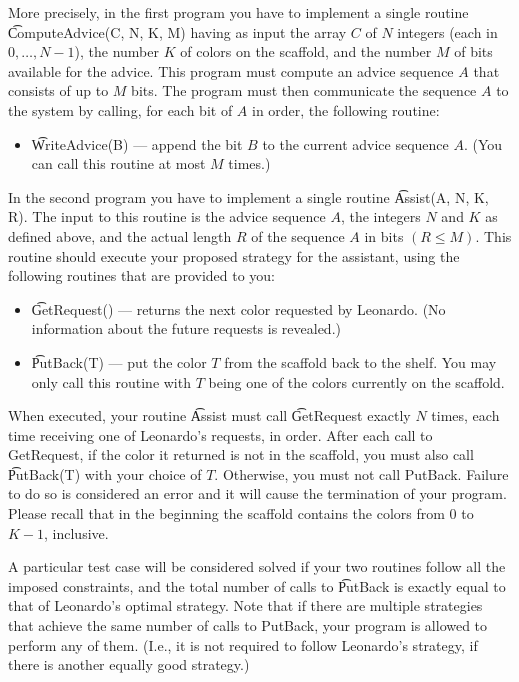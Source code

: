More precisely, in the first program you have to implement a single routine \t{ComputeAdvice(C, N, K, M)} having as input the array $C$ of $N$ integers (each in $0, \dots, N-1$), the number $K$ of colors on the scaffold, and the number $M$ of bits available for the advice. This program must compute an advice sequence $A$ that consists of up to $M$ bits. The program must then communicate the sequence $A$ to the system by calling, for each bit of $A$ in order, the following routine:

\begin{itemize}

\item \t{WriteAdvice(B)} --- append the bit $B$ to the current advice sequence $A$. (You can call this routine at most $M$ times.)

\end{itemize}

In the second program you have to implement a single routine \t{Assist(A, N, K, R)}. The input to this routine is the advice sequence $A$, the integers $N$ and $K$ as defined above, and the actual length $R$ of the sequence $A$ in bits $(R \le M)$. This routine should execute your proposed strategy for the assistant, using the following routines that are provided to you:

\begin{itemize}

\item \t{GetRequest()} --- returns the next color requested by Leonardo. (No information about the future requests is revealed.)

\item \t{PutBack(T)} --- put the color $T$ from the scaffold back to the shelf. You may only call this routine with $T$ being one of the colors currently on the scaffold.

\end{itemize}

When executed, your routine \t{Assist} must call \t{GetRequest} exactly $N$ times, each time receiving one of Leonardo's requests, in order. After each call to GetRequest, if the color it returned is not in the scaffold, you must also call \t{PutBack(T)} with your choice of $T$. Otherwise, you must not call PutBack. Failure to do so is considered an error and it will cause the termination of your program. Please recall that in the beginning the scaffold contains the colors from $0$ to $K-1$, inclusive.

A particular test case will be considered solved if your two routines follow all the imposed constraints, and the total number of calls to \t{PutBack} is exactly equal to that of Leonardo's optimal strategy. Note that if there are multiple strategies that achieve the same number of calls to PutBack, your program is allowed to perform any of them. (I.e., it is not required to follow Leonardo's strategy, if there is another equally good strategy.) 

